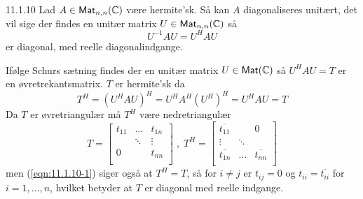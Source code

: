 %
%

\begin{saetning}{11.1.10}
	Lad $A \in \textsf{Mat}_{n,n}(\mathbb{C})$ være hermite'sk. Så kan $A$ 
	diagonaliseres unitært, det vil sige der findes en unitær matrix 
	$U \in \textsf{Mat}_{n,n}(\mathbb{C})$ så
	\[
		U^{-1}AU=U^HAU
	\]
	er diagonal, med reelle diagonalindgange.
\end{saetning}

\begin{bevis}
	Ifølge Schurs sætning findes der en unitær matrix $U \in \textsf{Mat}(\mathbb{C})$
	så $U^HAU = T$ er en øvretrekantsmatrix. $T$ er hermite'sk da
	\begin{equation}\label{eqn:11.1.10-1}
		T^H = (U^HAU)^H = U^HA^H(U^H)^H = U^HAU = T
	\end{equation}
	Da $T$ er øvretriangulær må $T^H$ være nedretriangulær
	\[
		T = \begin{bmatrix}
			t_{11} & \dots 	& t_{1n} \\
				   & \ddots & \vdots \\
			   0   & 		& t_{nn} \\
		\end{bmatrix} \; , \; T^H = \begin{bmatrix}
			\overline{t_{11}} & 	   &    0 \\
				\vdots		  & \ddots &  \\
			\overline{t_{1n}} & \dots  & \overline{t_{nn}} \\
		\end{bmatrix}
	\]
	men (\ref{eqn:11.1.10-1}) siger også at $T^H = T$, så for $i \not= j$ er
	$t_{ij} = 0$ og $t_{ii} = \overline{t_{ii}}$ for $i = 1,\dotsc,n$, hvilket
	betyder at $T$ er diagonal med reelle indgange.
\end{bevis}
